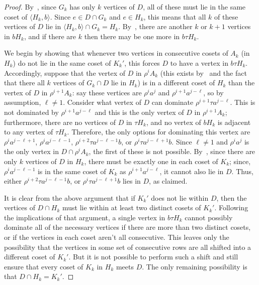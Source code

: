 \documentclass{amsart}
\theoremstyle{remark}
\theoremstyle{definition}
\begin{document}
\begin{proof}
By~, since $G_k$ has only $k$ vertices of $D$, all of these must lie in the same coset of $\langle H_k, b\rangle$. Since $e \in D\cap G_k$ and $e \in H_k$, this means that all $k$ of these vertices of $D$ lie in $\langle H_k,b\rangle \cap G_k=H_k$. By~, there are another $k$ or $k+1$ vertices in $bH_k$, and if there are $k$ then there may be one more in $b\tau H_k$.

We begin by showing that whenever two vertices in consecutive cosets of $A_k$ (in $H_k$) do not lie in the same coset of $K_k'$, this forces $D$ to have a vertex in $b\tau H_k$. Accordingly, suppose that the vertex of $D$ in $\rho^iA_k$ (this exists by~ and the fact that there all $k$ vertices of $G_k \cap D$ lie in $H_k$) is in a different coset of $H_k$ than the vertex of $D$ in $\rho^{i+1}A_k$: say these vertices are $\rho^i a^j$ and $\rho^{i+1}a^{j-\ell}$, so by assumption, $\ell \neq 1$. Consider what vertex of $D$ can dominate $\rho^{i+1}\tau a^{j-\ell}$. This is not dominated by $\rho^{i+1}a^{j-\ell}$ and this is the only vertex of $D$ in $\rho^{i+1}A_k$; furthermore, there are no vertices of $D$ in $\tau H_k$, and no vertex of $bH_k$ is adjacent to any vertex of $\tau H_k$. Therefore, the only options for dominating this vertex are $\rho^i a^{j-\ell+1}$, $\rho^i a^{j-\ell-1}$, $\rho^{i+2}\tau a^{j-\ell-1} b$, or $\rho^i \tau a^{j-\ell+1}b$. Since $\ell\neq 1$ and $\rho^i a^j$ is the only vertex in $D \cap \rho^iA_k$, the first of these is not possible. By~, since there are only $k$ vertices of $D$ in $H_k$, there must be exactly one in each coset of $K_k$; since, $\rho^i a^{j-\ell-1}$ is in the same coset of $K_k$ as $\rho^{i+1}a^{j-\ell}$, it cannot also lie in $D$. Thus, either $\rho^{i+2}\tau a^{j-\ell-1} b$, or $\rho^i \tau a^{j-\ell+1}b$ lies in $D$, as claimed.

It is clear from the above argument that if $K_k'$ does not lie within $D$, then the vertices of $D\cap H_k$ must lie within at least two distinct cosets of $K_k'$. Following the implications of that argument, a single vertex in $b\tau H_k$ cannot possibly dominate all of the necessary vertices if there are more than two distinct cosets, or if the vertices in each coset aren't all consecutive. This leaves only the possibility that the vertices in some set of consecutive rows are all shifted into a different coset of $K_k'$. But it is not possible to perform such a shift and still ensure that every coset of $K_k$ in $H_k$ meets $D$. The only remaining possibility is that $D \cap H_k=K_k'$.



\end{proof}
\end{document}
